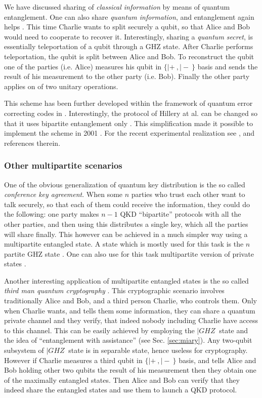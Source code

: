 \documentclass[rmp,12pt,preprint]{revtex4-2}
\begin{document}
We have discussed sharing of {\it classical information} by means of
quantum entanglement. One can also share {\it quantum information},
and entanglement again helps \cite{Hillery_secret_sharing}. This
time Charlie wants to split securely a qubit, so that Alice and Bob
would need to cooperate to recover it. Interestingly, sharing a {\it
quantum secret}, is essentially teleportation of a qubit through a
GHZ state. After Charlie performs teleportation, the qubit
is split between Alice and Bob. To reconstruct the qubit one of the
parties (i.e. Alice) measures his qubit in $\{|+\>,|-\>\}$ basis and
sends the result of his measurement to the other party (i.e. Bob).
Finally the other party applies on of two unitary operations.

This scheme has been further developed within the framework of
quantum error correcting codes in
\cite{Cleve_secret_sharing,Gottesman_secret_sharing}. Interestingly,
the protocol of Hillery at al. can be changed so that it uses
bipartite entanglement only \cite{EPR_secret_sharing}. This
simplification made it possible to implement the scheme in 2001
\cite{Tittelexp_secret_sharing}. For the recent experimental
realization see \cite{Panexp_secret_sharing}, and references
therein.

\subsubsection{Other multipartite scenarios}
\label{subsec:othermulti}
One of the obvious generalization of quantum key distribution is the
so called {\it conference key agreement}. When some $n$ parties who
trust each other want to talk securely, so that each of them could
receive the information, they could do the following: one party
makes $n-1$ QKD ``bipartite'' protocols with all the other parties,
and then using this distributes a single key, which all the parties
will share finally. This however can be achieved in a much simpler
way using a multipartite entangled state. A state which is mostly
used for this task is the $n$ partite GHZ state
\cite{ChenLo_multi_dist}. One can also use for this task multipartite version
of private states \cite{AH-pditdist}.

Another interesting application of multipartite entangled states is
the so called {\it third man quantum cryptography}
\cite{Zuk_third_man_crypto}. This cryptographic scenario involves
traditionally Alice and Bob, and a third person Charlie, who
controls them. Only when Charlie wants, and tells them some
information, they can share a quantum private channel and they
verify, that indeed nobody including Charlie have access to this
channel. This can be easily achieved by employing the $|GHZ\>$ state
and the idea of ``entanglement with assistance'' (see Sec.
\ref{sec:miary}). Any two-qubit subsystem of $|GHZ\>$ state is in
separable state, hence useless for cryptography. However if
Charlie measures a third qubit in $\{|+\>,|-\>\}$ basis, and tells Alice
and Bob holding other two qubits the result of his measurement then
they obtain one of the maximally entangled states. Then Alice and
Bob can verify that they indeed share the entangled states and use
them to launch a QKD protocol.
\end{document}
